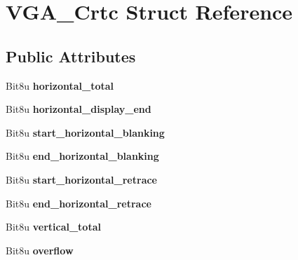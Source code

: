 \hypertarget{structVGA__Crtc}{\section{V\-G\-A\-\_\-\-Crtc Struct Reference}
\label{structVGA__Crtc}
}
\subsection*{Public Attributes}
\begin{DoxyCompactItemize}
\item 
\hypertarget{structVGA__Crtc_a5b3d46767dc0e490977eb62333f3c001}{Bit8u {\bfseries horizontal\-\_\-total}}\label{structVGA__Crtc_a5b3d46767dc0e490977eb62333f3c001}

\item 
\hypertarget{structVGA__Crtc_a55ad8143f3ff3da393de270a47755e77}{Bit8u {\bfseries horizontal\-\_\-display\-\_\-end}}\label{structVGA__Crtc_a55ad8143f3ff3da393de270a47755e77}

\item 
\hypertarget{structVGA__Crtc_a2aa981966466b30d1e1a0547b592f928}{Bit8u {\bfseries start\-\_\-horizontal\-\_\-blanking}}\label{structVGA__Crtc_a2aa981966466b30d1e1a0547b592f928}

\item 
\hypertarget{structVGA__Crtc_ac0eb7b18fdad5c65d0f343ea0e10511c}{Bit8u {\bfseries end\-\_\-horizontal\-\_\-blanking}}\label{structVGA__Crtc_ac0eb7b18fdad5c65d0f343ea0e10511c}

\item 
\hypertarget{structVGA__Crtc_af5538e5f7eb677d91c249f199dae38e2}{Bit8u {\bfseries start\-\_\-horizontal\-\_\-retrace}}\label{structVGA__Crtc_af5538e5f7eb677d91c249f199dae38e2}

\item 
\hypertarget{structVGA__Crtc_a3c59fbeeb6e623b54de0955819e5290d}{Bit8u {\bfseries end\-\_\-horizontal\-\_\-retrace}}\label{structVGA__Crtc_a3c59fbeeb6e623b54de0955819e5290d}

\item 
\hypertarget{structVGA__Crtc_a339e23aec4157675d20dde7d5252fdb1}{Bit8u {\bfseries vertical\-\_\-total}}\label{structVGA__Crtc_a339e23aec4157675d20dde7d5252fdb1}

\item 
\hypertarget{structVGA__Crtc_a1b966028732d9faab48cbe495b7a1bee}{Bit8u {\bfseries overflow}}\label{structVGA__Crtc_a1b966028732d9faab48cbe495b7a1bee}


\end{DoxyCompactItemize}
